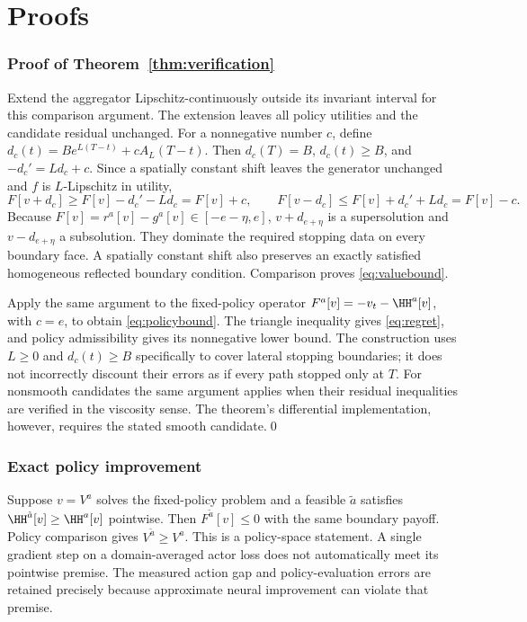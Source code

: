 \section{Proofs}\label{app:proofs}
\subsubsection{Proof of Theorem~\ref{thm:verification}}
Extend the aggregator Lipschitz-continuously outside its invariant interval for this comparison argument. The extension leaves all policy utilities and the candidate residual unchanged. For a nonnegative number $c$, define $d_c(t)=Be^{L(T-t)}+cA_L(T-t)$. Then $d_c(T)=B$, $d_c(t)\geq B$, and $-d_c'=Ld_c+c$. Since a spatially constant shift leaves the generator unchanged and $f$ is $L$-Lipschitz in utility,
\[
 F[v+d_c]\geq F[v]-d_c'-Ld_c=F[v]+c,
 \qquad F[v-d_c]\leq F[v]+d_c'+Ld_c=F[v]-c.
\]
Because $F[v]=r^a[v]-g^a[v]\in[-e-\eta,e]$, $v+d_{e+\eta}$ is a supersolution and $v-d_{e+\eta}$ a subsolution. They dominate the required stopping data on every boundary face. A spatially constant shift also preserves an exactly satisfied homogeneous reflected boundary condition. Comparison proves \eqref{eq:valuebound}.

Apply the same argument to the fixed-policy operator $F^a[v]=-v_t-\HH^a[v]$, with $c=e$, to obtain \eqref{eq:policybound}. The triangle inequality gives \eqref{eq:regret}, and policy admissibility gives its nonnegative lower bound. The construction uses $L\geq0$ and $d_c(t)\geq B$ specifically to cover lateral stopping boundaries; it does not incorrectly discount their errors as if every path stopped only at $T$. For nonsmooth candidates the same argument applies when their residual inequalities are verified in the viscosity sense. The theorem's differential implementation, however, requires the stated smooth candidate.\qed

\subsubsection{Exact policy improvement}
Suppose $v=V^a$ solves the fixed-policy problem and a feasible $\tilde a$ satisfies $\HH^{\tilde a}[v]\geq\HH^a[v]$ pointwise. Then $F^{\tilde a}[v]\leq0$ with the same boundary payoff. Policy comparison gives $V^{\tilde a}\geq V^a$. This is a policy-space statement. A single gradient step on a domain-averaged actor loss does not automatically meet its pointwise premise. The measured action gap and policy-evaluation errors are retained precisely because approximate neural improvement can violate that premise.

